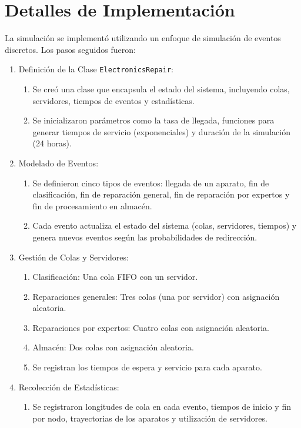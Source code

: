 \documentclass[12pt]{article}
\begin{document}
\section{Detalles de Implementación}
La simulación se implementó utilizando un enfoque de simulación de eventos discretos. Los pasos seguidos fueron:
\begin{enumerate}
    \item Definición de la Clase \texttt{ElectronicsRepair}:
    \begin{enumerate}
        \item Se creó una clase que encapsula el estado del sistema, incluyendo colas, servidores, tiempos de eventos y estadísticas.
        \item Se inicializaron parámetros como la tasa de llegada, funciones para generar tiempos de servicio (exponenciales) y duración de la simulación (24 horas).
    \end{enumerate}
    \item Modelado de Eventos:
    \begin{enumerate}
        \item Se definieron cinco tipos de eventos: llegada de un aparato, fin de clasificación, fin de reparación general, fin de reparación por expertos y fin de procesamiento en almacén.
        \item Cada evento actualiza el estado del sistema (colas, servidores, tiempos) y genera nuevos eventos según las probabilidades de redirección.
    \end{enumerate}
    \item Gestión de Colas y Servidores:
    \begin{enumerate}
        \item Clasificación: Una cola FIFO con un servidor.
        \item Reparaciones generales: Tres colas (una por servidor) con asignación aleatoria.
        \item Reparaciones por expertos: Cuatro colas con asignación aleatoria.
        \item Almacén: Dos colas con asignación aleatoria.
        \item Se registran los tiempos de espera y servicio para cada aparato.
    \end{enumerate}
    \item Recolección de Estadísticas:
    \begin{enumerate}
        \item Se registraron longitudes de cola en cada evento, tiempos de inicio y fin por nodo, trayectorias de los aparatos y utilización de servidores.

\end{enumerate}
\end{enumerate}
\end{document}
